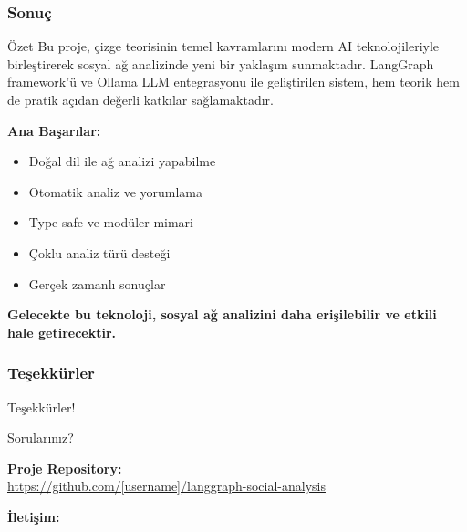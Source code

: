 \documentclass[aspectratio=169]{beamer}
\begin{document}
\begin{frame}
\frametitle{Sonuç}
\begin{block}{Özet}
Bu proje, çizge teorisinin temel kavramlarını modern AI teknolojileriyle birleştirerek sosyal ağ analizinde yeni bir yaklaşım sunmaktadır. LangGraph framework'ü ve Ollama LLM entegrasyonu ile geliştirilen sistem, hem teorik hem de pratik açıdan değerli katkılar sağlamaktadır.
\end{block}

\vspace{0.3cm}
\textbf{Ana Başarılar:}
\begin{itemize}
    \item Doğal dil ile ağ analizi yapabilme
    \item Otomatik analiz ve yorumlama
    \item Type-safe ve modüler mimari
    \item Çoklu analiz türü desteği
    \item Gerçek zamanlı sonuçlar
\end{itemize}

\vspace{0.3cm}
\begin{center}
\textbf{Gelecekte bu teknoloji, sosyal ağ analizini daha erişilebilir ve etkili hale getirecektir.}
\end{center}
\end{frame}

\begin{frame}
\frametitle{Teşekkürler}
\begin{center}
{\Huge Teşekkürler!}

\vspace{1cm}
{\Large Sorularınız?}

\vspace{1cm}
\textbf{Proje Repository:} \\
\url{https://github.com/[username]/langgraph-social-analysis}

\vspace{0.5cm}
\textbf{İletişim:} \\
[email@example.com]
\end{center}
\end{frame}
\end{document}
